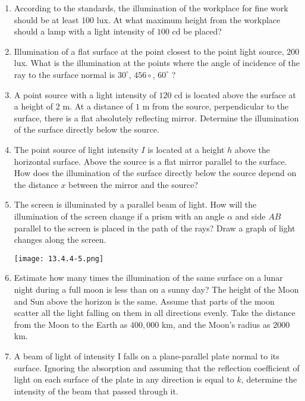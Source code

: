 \documentclass{article}
\begin{document}
\begin{enumerate}[label=13.4.\arabic*]


\item According to the standards, the illumination of the workplace for fine work should be at least $100$ lux. At what maximum height from the workplace should a lamp with a light intensity of $100$ cd be placed?

\item Illumination of a flat surface at the point closest to the point light source, $200$ lux. What is the illumination at the points where the angle of incidence of the ray to the surface normal is $30^\circ$, $456\circ$, $60^\circ$ ?

\item A point source with a light intensity of $120$ cd is located above the surface at a height of $2$ m. At a distance of $1$ m from the source, perpendicular to the surface, there is a flat absolutely reflecting mirror. Determine the illumination of the surface directly below the source.

\item The point source of light intensity $I$ is located at a height $h$ above the horizontal surface. Above the source is a flat mirror parallel to the surface. How does the illumination of the surface directly below the source depend on the distance $x$ between the mirror and the source?

\item The screen is illuminated by a parallel beam of light. How will the illumination of the screen change if a prism with an angle $\alpha$ and side $AB$ parallel to the screen is placed in the path of the rays? Draw a graph of light changes along the screen.

\begin{center}
    \texttt{[image: 13.4.4-5.png]}
\end{center}

\item Estimate how many times the illumination of the same surface on a lunar night during a full moon is less than on a sunny day? The height of the Moon and Sun above the horizon is the same. Assume that parts of the moon scatter all the light falling on them in all directions evenly. Take the distance from the Moon to the Earth as $400,000$ km, and the Moon's radius as $2000$ km.

\item A beam of light of intensity I falls on a plane-parallel plate normal to its surface. Ignoring the absorption and assuming that the reflection coefficient of light on each surface of the plate in any direction is equal to $k$, determine the intensity of the beam that passed through it.


\end{enumerate}
\end{document}
